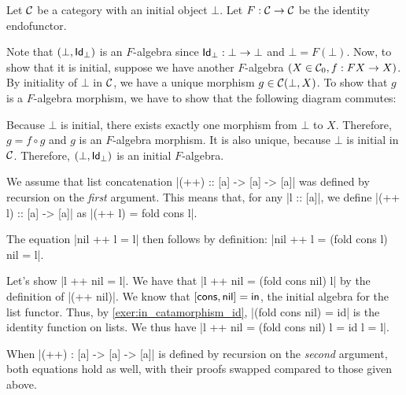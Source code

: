 \begin{solution}\label{sol:initialalg_for_idfun_with_initialob}
	Let $\CC$ be a category with an initial object $\bot$. Let $ F: \CC \to \CC $ be the identity endofunctor.

	Note that $ (\bot, \Id[\bot]) $ is an $ F $-algebra since $ \Id[\bot]: \bot \to \bot $ and $ \bot = F(\bot) $. Now, to show that it is initial, suppose we have another $ F $-algebra $ (X \in \Ob \CC, f: F X \to X) $. By initiality of $ \bot $ in $ \CC $, we have a unique morphism $ g \in \CC(\bot, X) $. To show that $ g $ is a $ F $-algebra morphism, we have to show that the following diagram commutes:
	\begin{center}
	\end{center}
	Because $ \bot $ is initial, there exists exactly one morphism from $ \bot $ to $ X $. Therefore, $ g = f \circ g $ and $ g $ is an $ F $-algebra morphism. It is also unique, because $ \bot $ is initial in $ \CC $. Therefore, $ (\bot, \Id[\bot]) $ is an initial $ F $-algebra.
\end{solution}


\begin{solution}\label{sol:list-concat-nil}
  We assume that list concatenation |(++) :: [a] -> [a] -> [a]| was defined by recursion on the \emph{first} argument.
  This means that, for any |l :: [a]|, we define |(++ l) :: [a] -> [a]| as |(++ l) = fold cons l|.

  The equation |nil ++ l = l| then follows by definition: |nil ++ l = (fold cons l) nil = l|.

  Let's show |l ++ nil = l|.
  We have that |l ++ nil = (fold cons nil) l| by the definition of |(++ nil)|.
  We know that $[\cons,\nil] = \In$, the initial algebra for the list functor.
  Thus, by \cref{exer:in_catamorphism_id}, |(fold cons nil) = id| is the identity function on lists.
  We thus have |l ++ nil = (fold cons nil) l = id l = l|.

  When |(++) : [a] -> [a] -> [a]| is defined by recursion on the \emph{second} argument, both equations hold as well, with their proofs swapped compared to those given above.
\end{solution}

